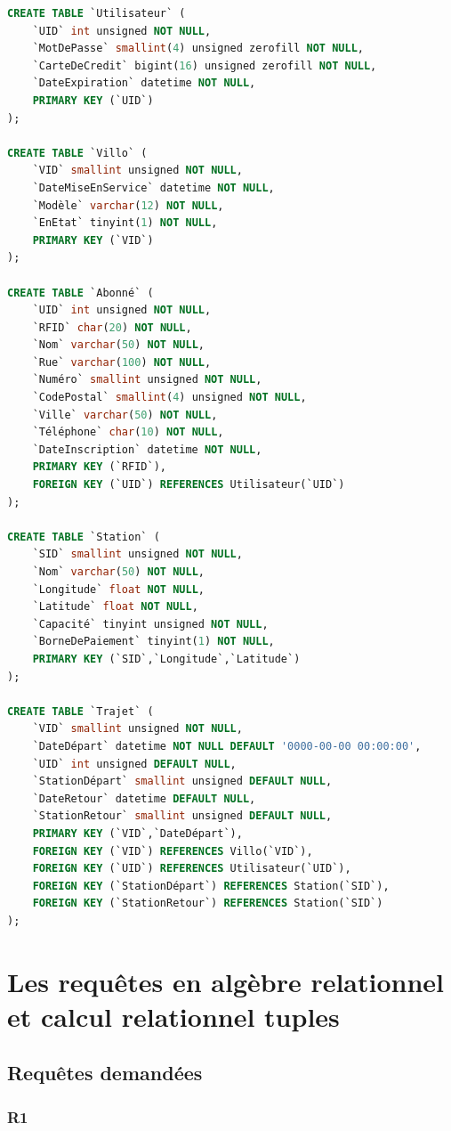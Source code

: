 \documentclass[a4paper, 12pt]{report}
\begin{document}
\begin{lstlisting}[language=sql]
CREATE TABLE `Utilisateur` (
	`UID` int unsigned NOT NULL,
	`MotDePasse` smallint(4) unsigned zerofill NOT NULL,
	`CarteDeCredit` bigint(16) unsigned zerofill NOT NULL,
	`DateExpiration` datetime NOT NULL,
	PRIMARY KEY (`UID`)
);

CREATE TABLE `Villo` (
	`VID` smallint unsigned NOT NULL,
	`DateMiseEnService` datetime NOT NULL,
	`Modèle` varchar(12) NOT NULL,
	`EnEtat` tinyint(1) NOT NULL,
	PRIMARY KEY (`VID`)
);

CREATE TABLE `Abonné` (
	`UID` int unsigned NOT NULL,
	`RFID` char(20) NOT NULL,
	`Nom` varchar(50) NOT NULL,
	`Rue` varchar(100) NOT NULL,
	`Numéro` smallint unsigned NOT NULL,
	`CodePostal` smallint(4) unsigned NOT NULL,
	`Ville` varchar(50) NOT NULL,
	`Téléphone` char(10) NOT NULL,
	`DateInscription` datetime NOT NULL,
	PRIMARY KEY (`RFID`),
	FOREIGN KEY (`UID`) REFERENCES Utilisateur(`UID`)
);

CREATE TABLE `Station` (
	`SID` smallint unsigned NOT NULL,
	`Nom` varchar(50) NOT NULL,
	`Longitude` float NOT NULL,
	`Latitude` float NOT NULL,
	`Capacité` tinyint unsigned NOT NULL,
	`BorneDePaiement` tinyint(1) NOT NULL,
	PRIMARY KEY (`SID`,`Longitude`,`Latitude`)
);

CREATE TABLE `Trajet` (
	`VID` smallint unsigned NOT NULL,
	`DateDépart` datetime NOT NULL DEFAULT '0000-00-00 00:00:00',
	`UID` int unsigned DEFAULT NULL,
	`StationDépart` smallint unsigned DEFAULT NULL,
	`DateRetour` datetime DEFAULT NULL,
	`StationRetour` smallint unsigned DEFAULT NULL,
	PRIMARY KEY (`VID`,`DateDépart`),
	FOREIGN KEY (`VID`) REFERENCES Villo(`VID`),
	FOREIGN KEY (`UID`) REFERENCES Utilisateur(`UID`),
	FOREIGN KEY (`StationDépart`) REFERENCES Station(`SID`),
	FOREIGN KEY (`StationRetour`) REFERENCES Station(`SID`)
);
\end{lstlisting}

\section*{Les requêtes en algèbre relationnel et calcul relationnel tuples} %

\subsection*{Requêtes demandées}

\subsubsection*{R1}
\end{document}
